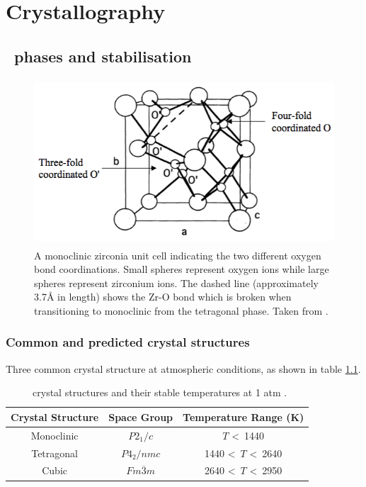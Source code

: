 \chapter{Crystallography}

\label{ch:crystallography}

\section{\zirconia\ phases and stabilisation}

\begin{figure}[htp]
\centering
\includegraphics[height=6.2cm]{images/coordination.png}
\caption{A monoclinic zirconia unit cell indicating the two different oxygen bond coordinations. Small spheres represent oxygen ions while large spheres represent zirconium ions. The dashed line (approximately 3.7\r{A} in length) shows the Zr-O bond which is broken when transitioning to monoclinic from the tetragonal phase. Taken from \cite{Xia2010}.
\label{figure:coordination}}
\end{figure}

\subsection{Common and predicted crystal structures}

Three common crystal structure at atmospheric conditions, as shown in table \ref{table:phases}.

\begin{table}[htp]
\centering
\onehalfspacing
\caption{\zirconia\ crystal structures and their stable temperatures at 1 atm \cite{Howard1988}.}
\label{table:phases}
\begin{tabular}{ccc}
\hline
{Crystal Structure} & {Space Group}    & {Temperature Range (K)} \\ \hline
\multicolumn{1}{c|}{Monoclinic} & \multicolumn{1}{c|}{$P2_1/c$} & \multicolumn{1}{c}{$T$ \textless\ 1440}     \\
\multicolumn{1}{c|}{Tetragonal} & \multicolumn{1}{c|}{$P4_2/nmc$} & \multicolumn{1}{c}{1440 \textless\ $T$ \textless\ 2640}        \\
\multicolumn{1}{c|}{Cubic} & \multicolumn{1}{c|}{$Fm\overline{3}m$}     & \multicolumn{1}{c}{2640 \textless\ $T$ \textless\ 2950}      \\ \hline
\end{tabular}
\end{table}

